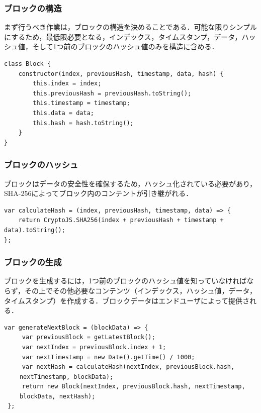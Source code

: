 \newpage

\subsubsection{ブロックの構造}

まず行うべき作業は，ブロックの構造を決めることである．可能な限りシンプルにするため，最低限必要となる，インデックス，タイムスタンプ，データ，ハッシュ値，そして1つ前のブロックのハッシュ値のみを構造に含める．

\begin{verbatim}
class Block {
    constructor(index, previousHash, timestamp, data, hash) {
        this.index = index;
        this.previousHash = previousHash.toString();
        this.timestamp = timestamp;
        this.data = data;
        this.hash = hash.toString();
    }
}
\end{verbatim}

\subsubsection{ブロックのハッシュ}
ブロックはデータの安全性を確保するため，ハッシュ化されている必要があり，SHA-256によってブロック内のコンテントが引き継がれる．

\begin{verbatim}
var calculateHash = (index, previousHash, timestamp, data) => { 
    return CryptoJS.SHA256(index + previousHash + timestamp + data).toString(); 
}; 
\end{verbatim}

\newpage

\subsubsection{ブロックの生成}
ブロックを生成するには，1つ前のブロックのハッシュ値を知っていなければならず，その上でその他必要なコンテンツ（インデックス，ハッシュ値，データ，タイムスタンプ）を作成する．ブロックデータはエンドユーザによって提供される．

\begin{verbatim}
var generateNextBlock = (blockData) => { 
     var previousBlock = getLatestBlock(); 
     var nextIndex = previousBlock.index + 1; 
     var nextTimestamp = new Date().getTime() / 1000; 
     var nextHash = calculateHash(nextIndex, previousBlock.hash,
　　 nextTimestamp, blockData); 
     return new Block(nextIndex, previousBlock.hash, nextTimestamp,
　　 blockData, nextHash); 
 }; 
\end{verbatim}

